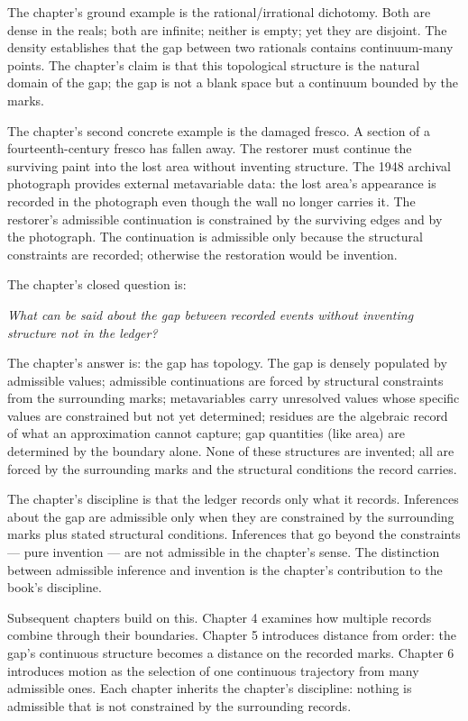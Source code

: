 \begin{chapteressay}
The chapter's ground example is the rational/irrational dichotomy.
Both are dense in the reals; both are infinite; neither is empty;
yet they are disjoint. The density establishes that the gap between
two rationals contains continuum-many points. The chapter's claim
is that this topological structure is the natural domain of the
gap; the gap is not a blank space but a continuum bounded by the
marks.

The chapter's second concrete example is the damaged fresco. A
section of a fourteenth-century fresco has fallen away. The
restorer must continue the surviving paint into the lost area
without inventing structure. The 1948 archival photograph provides
external metavariable data: the lost area's appearance is recorded
in the photograph even though the wall no longer carries it. The
restorer's admissible continuation is constrained by the surviving
edges and by the photograph. The continuation is admissible only
because the structural constraints are recorded; otherwise the
restoration would be invention.

The chapter's closed question is:

\begin{center}
\emph{What can be said about the gap between recorded events without
inventing structure not in the ledger?}
\end{center}

The chapter's answer is: the gap has topology. The gap is densely
populated by admissible values; admissible continuations are forced
by structural constraints from the surrounding marks; metavariables
carry unresolved values whose specific values are constrained but
not yet determined; residues are the algebraic record of what an
approximation cannot capture; gap quantities (like area) are
determined by the boundary alone. None of these structures are
invented; all are forced by the surrounding marks and the
structural conditions the record carries.

The chapter's discipline is that the ledger records only what it
records. Inferences about the gap are admissible only when they
are constrained by the surrounding marks plus stated structural
conditions. Inferences that go beyond the constraints --- pure
invention --- are not admissible in the chapter's sense. The
distinction between admissible inference and invention is the
chapter's contribution to the book's discipline.

Subsequent chapters build on this. Chapter 4 examines how multiple
records combine through their boundaries. Chapter 5 introduces
distance from order: the gap's continuous structure becomes a
distance on the recorded marks. Chapter 6 introduces motion as the
selection of one continuous trajectory from many admissible ones.
Each chapter inherits the chapter's discipline: nothing is
admissible that is not constrained by the surrounding records.

\end{chapteressay}

